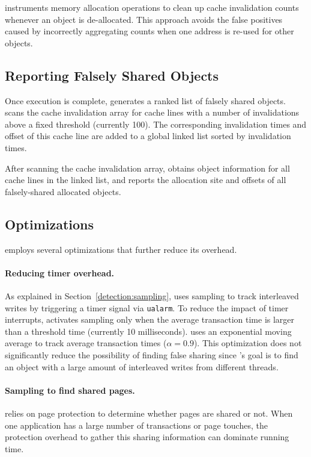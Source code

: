 \sheriffdetect{} instruments memory allocation operations to
clean up cache invalidation counts whenever an object is
de-allocated. This approach avoids the false positives caused by
incorrectly aggregating counts when one address is re-used for other
objects.

\subsection{Reporting Falsely Shared Objects}

Once execution is complete, \sheriffdetect{} generates a ranked list of
falsely shared objects.  \sheriffdetect{} scans the cache invalidation
array for cache lines with a number of invalidations above a fixed
threshold (currently 100).  The corresponding invalidation times and
offset of this cache line are added to a global linked list sorted by
invalidation times.

After scanning the cache invalidation array, \sheriffdetect{} obtains object
information for all cache lines in the linked list, and reports
the allocation site and offsets of all falsely-shared allocated objects.

\subsection{Optimizations}

\sheriffdetect{} employs several optimizations that further reduce its overhead.

\paragraph{Reducing timer overhead.} 
As explained in Section~\ref{detection:sampling},
\sheriffdetect{} uses sampling to track 
interleaved writes by triggering a timer signal via \texttt{ualarm}. To reduce the
impact of timer interrupts, \sheriffdetect{} activates sampling
only when the average transaction time is larger than a threshold time
(currently 10 milliseconds). \sheriffdetect{} uses an exponential moving
average to track average transaction times ($\alpha = 0.9$). This
optimization does not significantly reduce 
the possibility of finding false sharing since
\sheriffdetect{}'s goal
 is to find an object with a large amount of interleaved
writes from different threads.

\paragraph{Sampling to find shared pages.} \sheriffdetect{} relies on
page protection to determine whether pages are shared or not. When one
application has a large number of transactions or page touches, the
protection overhead to gather this sharing information can dominate running
time.

